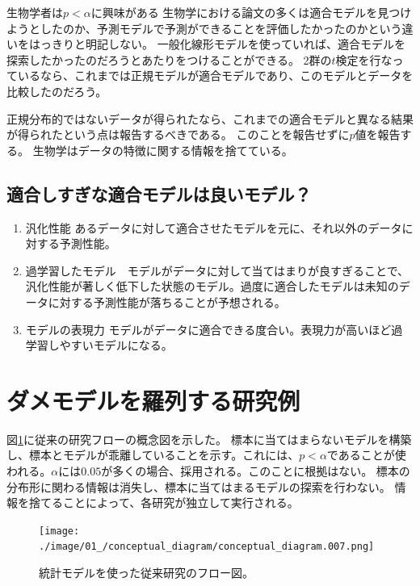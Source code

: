 \begin{SMbox}{生物学者は$p<\alpha$に興味がある}
    生物学における論文の多くは適合モデルを見つけようとしたのか、予測モデルで予測ができることを評価したかったのかという違いをはっきりと明記しない。
    一般化線形モデルを使っていれば、適合モデルを探索したかったのだろうとあたりをつけることができる。
    2群の$t$検定を行なっているなら、これまでは正規モデルが適合モデルであり、このモデルとデータを比較したのだろう。

    
    正規分布的ではないデータが得られたなら、これまでの適合モデルと異なる結果が得られたという点は報告するべきである。
    このことを報告せずに$p$値を報告する。
    生物学はデータの特徴に関する情報を捨てている。
\end{SMbox}

\subsection{適合しすぎな適合モデルは良いモデル？}%

\begin{enumerate}
    \item 汎化性能 あるデータに対して適合させたモデルを元に、それ以外のデータに対する予測性能。
    \item 過学習したモデル　モデルがデータに対して当てはまりが良すぎることで、汎化性能が著しく低下した状態のモデル。過度に適合したモデルは未知のデータに対する予測性能が落ちることが予想される。
    \item モデルの表現力 モデルがデータに適合できる度合い。表現力が高いほど過学習しやすいモデルになる。
\end{enumerate}


\section{ダメモデルを羅列する研究例}

図\ref{fig:conceptual_diagram_statistics_research_current}に従来の研究フローの概念図を示した。
標本に当てはまらないモデルを構築し、標本とモデルが乖離していることを示す。これには、$p<\alpha$であることが使われる。$\alpha$には$0.05$が多くの場合、採用される。このことに根拠はない。
標本の分布形に関わる情報は消失し、標本に当てはまるモデルの探索を行わない。
情報を捨てることによって、各研究が独立して実行される。

\begin{figure}
    \begin{center}
        \texttt{[image: ./image/01\_/conceptual\_diagram/conceptual\_diagram.007.png]}
        \caption{統計モデルを使った従来研究のフロー図。}
        \label{fig:conceptual_diagram_statistics_research_current}
    \end{center}
\end{figure}

